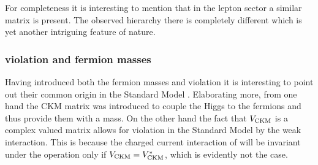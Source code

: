 \noindent For completeness it is interesting to mention that in the
lepton sector a similar matrix is present. The observed hierarchy there is completely
different which is yet another intriguing feature of nature.

\subsubsection{\CP violation and fermion masses}
Having introduced both the fermion masses and \CP violation it is interesting to point out their common origin in
the Standard Model \cite{KM-mechanism}. Elaborating more, from one hand the CKM matrix was introduced to couple
the Higgs to the fermions and thus provide them with a mass. On the other hand the fact that $V_{\rm CKM}$ is a
complex valued matrix allows for \CP violation in the Standard Model by the weak interaction. This is because
the charged current interaction of  will be invariant under the \CP operation only
if $V_{\rm CKM}=V_{\rm CKM}^*$, which is evidently not the case.
